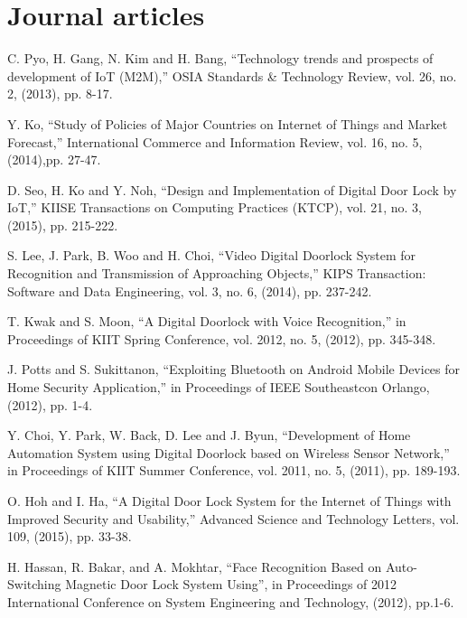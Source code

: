 \documentclass[twoside,a4paper,16pt]{book}
\begin{document}
{{\section{Journal articles}
\begin{enumerate}[label={[\arabic*]}]

	\item C. Pyo, H. Gang, N. Kim and H. Bang, “Technology trends and prospects 
	of development of IoT (M2M),” OSIA Standards \& Technology Review, vol. 26, no. 2, (2013), pp. 8-17.\\
	\item Y. Ko, “Study of Policies of Major Countries on Internet of Things and Market Forecast,” International Commerce and Information Review, vol. 16, no. 5, (2014),pp. 27-47.\\
	\item D.  Seo,  H.  Ko  and  Y.  Noh,  “Design  and  Implementation  of  Digital  Door  Lock  by  IoT,”  KIISE Transactions on Computing Practices (KTCP), vol. 21, no. 3, (2015), pp. 215-222.\\
	\item S. Lee, J. Park, B. Woo and H. Choi, “Video Digital Doorlock System for Recognition and Transmission of Approaching Objects,” KIPS Transaction: Software and Data Engineering, vol. 3, no. 6, (2014), pp. 237-242.\\
	\item 	T. Kwak and S. Moon, “A Digital Doorlock with Voice Recognition,” in Proceedings of KIIT Spring Conference, vol. 2012,  no. 5, (2012), pp. 345-348.\\
	\item J. Potts and S. Sukittanon, “Exploiting Bluetooth on Android Mobile Devices for Home Security Application,” in Proceedings of IEEE Southeastcon Orlango, (2012), pp. 1-4.\\
	\item 	Y. Choi, Y. Park, W. Back, D. Lee and J. Byun, “Development of Home Automation System using Digital Doorlock based on Wireless Sensor Network,” in Proceedings of KIIT Summer Conference, vol. 2011, no. 5, (2011), pp. 189-193.\\
	\item O. Hoh and I. Ha, “A Digital Door Lock System for the Internet of Things with Improved Security and Usability,” Advanced Science and Technology Letters, vol. 109, (2015), pp. 33-38.\\
	\item 	H. Hassan, R. Bakar, and A. Mokhtar, “Face Recognition Based on Auto-Switching Magnetic Door Lock System Using”, in Proceedings of 2012 International Conference on System Engineering and Technology, (2012), pp.1-6.\\

\end{enumerate}}}
\end{document}
